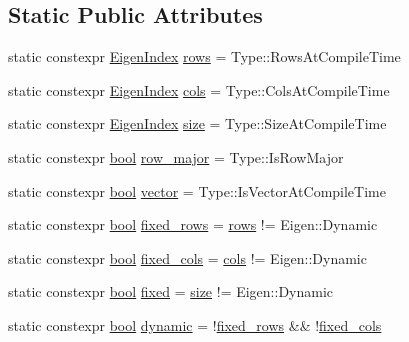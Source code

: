 \subsection*{Static Public Attributes}
\begin{DoxyCompactItemize}
\item 
static constexpr \mbox{\hyperlink{eigen_8h_a4e595ab182718d84a409dd05e0829bdd}{Eigen\+Index}} \mbox{\hyperlink{struct_eigen_props_a2f00028920ef3138640e602c80ff9a0d}{rows}} = Type\+::\+Rows\+At\+Compile\+Time
\item 
static constexpr \mbox{\hyperlink{eigen_8h_a4e595ab182718d84a409dd05e0829bdd}{Eigen\+Index}} \mbox{\hyperlink{struct_eigen_props_a11241a3435168ade35c58f1a2899df8b}{cols}} = Type\+::\+Cols\+At\+Compile\+Time
\item 
static constexpr \mbox{\hyperlink{eigen_8h_a4e595ab182718d84a409dd05e0829bdd}{Eigen\+Index}} \mbox{\hyperlink{struct_eigen_props_a9765247d03fa7156e28b73409689df17}{size}} = Type\+::\+Size\+At\+Compile\+Time
\item 
static constexpr \mbox{\hyperlink{asdl_8h_af6a258d8f3ee5206d682d799316314b1}{bool}} \mbox{\hyperlink{struct_eigen_props_a290ebf6baed2dca134f928c13dda4030}{row\+\_\+major}} = Type\+::\+Is\+Row\+Major
\item 
static constexpr \mbox{\hyperlink{asdl_8h_af6a258d8f3ee5206d682d799316314b1}{bool}} \mbox{\hyperlink{struct_eigen_props_a6c26ad4c67abd91b08285b63afed9ab9}{vector}} = Type\+::\+Is\+Vector\+At\+Compile\+Time
\item 
static constexpr \mbox{\hyperlink{asdl_8h_af6a258d8f3ee5206d682d799316314b1}{bool}} \mbox{\hyperlink{struct_eigen_props_a4fdf3fa6c9908561ddfac176c9c106f7}{fixed\+\_\+rows}} = \mbox{\hyperlink{struct_eigen_props_a2f00028920ef3138640e602c80ff9a0d}{rows}} != Eigen\+::\+Dynamic
\item 
static constexpr \mbox{\hyperlink{asdl_8h_af6a258d8f3ee5206d682d799316314b1}{bool}} \mbox{\hyperlink{struct_eigen_props_afc4954afca9a4dd098b009a5653b2b48}{fixed\+\_\+cols}} = \mbox{\hyperlink{struct_eigen_props_a11241a3435168ade35c58f1a2899df8b}{cols}} != Eigen\+::\+Dynamic
\item 
static constexpr \mbox{\hyperlink{asdl_8h_af6a258d8f3ee5206d682d799316314b1}{bool}} \mbox{\hyperlink{struct_eigen_props_a4234c331255e14bd0e2a817ac9e0352e}{fixed}} = \mbox{\hyperlink{_s_d_l__opengl__glext_8h_a3d1e3edfcf61ca2d831883e1afbad89e}{size}} != Eigen\+::\+Dynamic
\item 
static constexpr \mbox{\hyperlink{asdl_8h_af6a258d8f3ee5206d682d799316314b1}{bool}} \mbox{\hyperlink{struct_eigen_props_a8cda015be17e948b92d687ff58c78169}{dynamic}} = !\mbox{\hyperlink{struct_eigen_props_a4fdf3fa6c9908561ddfac176c9c106f7}{fixed\+\_\+rows}} \&\& !\mbox{\hyperlink{struct_eigen_props_afc4954afca9a4dd098b009a5653b2b48}{fixed\+\_\+cols}}

\end{DoxyCompactItemize}
